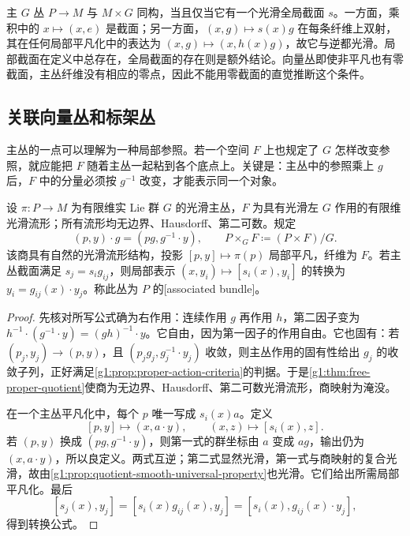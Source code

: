 \begin{example}\label{g1:exm:principal-global-section}
	主 \(G\) 丛 \(P\to M\) 与 \(M\times G\) 同构，当且仅当它有一个光滑全局截面 \(s\)。一方面，乘积中的 \(x\mapsto(x,e)\) 是截面；另一方面，\((x,g)\mapsto s(x)g\) 在每条纤维上双射，其在任何局部平凡化中的表达为 \((x,g)\mapsto(x,h(x)g)\)，故它与逆都光滑。局部截面在定义中总存在，全局截面的存在则是额外结论。向量丛即使非平凡也有零截面，主丛纤维没有相应的零点，因此不能用零截面的直觉推断这个条件。
\end{example}

\subsection{关联向量丛和标架丛}
\label{g1:subsec:1801:03}

主丛的一点可以理解为一种局部参照。若一个空间 \(F\) 上也规定了 \(G\) 怎样改变参照，就应能把 \(F\) 随着主丛一起粘到各个底点上。关键是：主丛中的参照乘上 \(g\) 后，\(F\) 中的分量必须按 \(g^{-1}\) 改变，才能表示同一个对象。

\begin{proposition}\label{g1:prop:associated-fiber-bundle}
	设 \(\pi:P\to M\) 为有限维实 Lie 群 \(G\) 的光滑主丛，\(F\) 为具有光滑左 \(G\) 作用的有限维光滑流形；所有流形均无边界、Hausdorff、第二可数。规定
	\[
		(p,y)\cdot g=(pg,g^{-1}\cdot y),\qquad
		P\times_G F\coloneqq(P\times F)/G.
	\]
	该商具有自然的光滑流形结构，投影 \([p,y]\mapsto\pi(p)\) 局部平凡，纤维为 \(F\)。若主丛截面满足 \(s_j=s_i g_{ij}\)，则局部表示 \((x,y_i)\mapsto[s_i(x),y_i]\) 的转换为 \(y_i=g_{ij}(x)\cdot y_j\)。称此丛为 \(P\) 的[associated bundle]。
\end{proposition}
\begin{proof}
	先核对所写公式确为右作用：连续作用 \(g\) 再作用 \(h\)，第二因子变为 \(h^{-1}\cdot(g^{-1}\cdot y)=(gh)^{-1}\cdot y\)。它自由，因为第一因子的作用自由。它也固有：若 \((p_j,y_j)\to(p,y)\)，且 \((p_jg_j,g_j^{-1}\cdot y_j)\) 收敛，则主丛作用的固有性给出 \(g_j\) 的收敛子列，正好满足\cref{g1:prop:proper-action-criteria}的判据。于是\cref{g1:thm:free-proper-quotient}使商为无边界、Hausdorff、第二可数光滑流形，商映射为淹没。

	在一个主丛平凡化中，每个 \(p\) 唯一写成 \(s_i(x)a\)。定义
	\[
		[p,y]\longmapsto(x,a\cdot y),\qquad
		(x,z)\longmapsto[s_i(x),z].
	\]
	若 \((p,y)\) 换成 \((pg,g^{-1}\cdot y)\)，则第一式的群坐标由 \(a\) 变成 \(ag\)，输出仍为 \((x,a\cdot y)\)，所以良定义。两式互逆；第二式显然光滑，第一式与商映射的复合光滑，故由\cref{g1:prop:quotient-smooth-universal-property}也光滑。它们给出所需局部平凡化。最后
	\[
		[s_j(x),y_j]=[s_i(x)g_{ij}(x),y_j]
		=[s_i(x),g_{ij}(x)\cdot y_j],
	\]
	得到转换公式。
\end{proof}

